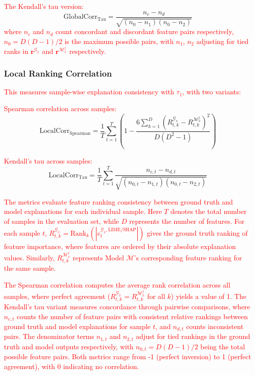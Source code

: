 \textcolor{red}{The Kendall's tau version:}
\begin{equation}
\text{GlobalCorr}_{\text{Tau}} = \frac{n_c - n_d}{\sqrt{(n_0 - n_1)(n_0 - n_2)}}
\end{equation}
\textcolor{red}{where $n_c$ and $n_d$ count concordant and discordant feature pairs respectively, $n_0 = D(D-1)/2$ is the maximum possible pairs, with $n_1$, $n_2$ adjusting for tied ranks in $\mathbf{r}^{\mathcal{G}_x}$ and $\mathbf{r}^{\mathcal{M}_x^j}$ respectively.}

\subsubsection*{Local Ranking Correlation}
\textcolor{red}{This measures sample-wise explanation consistency with $\tau_1$, with two variants:}

\textcolor{red}{Spearman correlation across samples:}
\begin{equation}
\text{LocalCorr}_{\text{Spearman}} = \frac{1}{T}\sum_{t=1}^T \left(1 - \frac{6\sum_{k=1}^D (R_{t,k}^{\mathcal{G}_x} - R_{t,k}^{\mathcal{M}_x^j})^2}{D(D^2-1)}\right)
\end{equation}

\textcolor{red}{Kendall's tau across samples:}
\begin{equation}
\text{LocalCorr}_{\text{Tau}} = \frac{1}{T}\sum_{t=1}^T \frac{n_{c,t} - n_{d,t}}{\sqrt{(n_{0,t} - n_{1,t})(n_{0,t} - n_{2,t})}}
\end{equation}

\textcolor{red}{The metrics evaluate feature ranking consistency between ground truth and model explanations for each individual sample. Here $T$ denotes the total number of samples in the evaluation set, while $D$ represents the number of features. For each sample $t$, $R_{t,k}^{\mathcal{G}_x} = \text{Rank}_k(|e_t^{\mathcal{G}_x,\text{LIME/SHAP}}|)$ gives the ground truth ranking of feature importance, where features are ordered by their absolute explanation values. Similarly, $R_{t,k}^{\mathcal{M}_x^j}$ represents Model $\mathcal{M}$'s corresponding feature ranking for the same sample.}

\textcolor{red}{The Spearman correlation computes the average rank correlation across all samples, where perfect agreement ($R_{t,k}^{\mathcal{G}_x} = R_{t,k}^{\mathcal{M}_x^j}$ for all $k$) yields a value of 1. The Kendall's tau variant measures concordance through pairwise comparisons, where $n_{c,t}$ counts the number of feature pairs with consistent relative rankings between ground truth and model explanations for sample $t$, and $n_{d,t}$ counts inconsistent pairs. The denominator terms $n_{1,t}$ and $n_{2,t}$ adjust for tied rankings in the ground truth and model outputs respectively, with $n_{0,t} = D(D-1)/2$ being the total possible feature pairs. Both metrics range from -1 (perfect inversion) to 1 (perfect agreement), with 0 indicating no correlation.}

